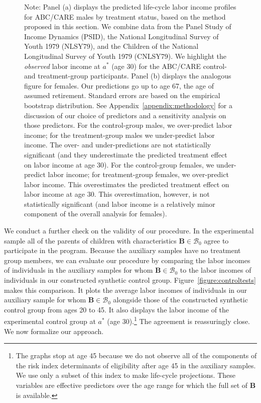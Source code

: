 \begin{figure}
\begin{subfigure}[h]{0.5\textwidth}
\end{subfigure}
\footnotesize \justify
Note: Panel (a) displays the predicted life-cycle labor income profiles for ABC/CARE males by treatment status, based on the method proposed in this section. We combine data from the Panel Study of Income Dynamics (PSID), the National Longitudinal Survey of Youth 1979 (NLSY79), and the Children of the National Longitudinal Survey of Youth 1979 (CNLSY79). We highlight the \textit{observed} labor income at $a^*$ (age 30) for the ABC/CARE control- and treatment-group participants. Panel (b) displays the analogous figure for females. Our predictions go up to age 67, the age of assumed retirement. Standard errors are based on the empirical bootstrap distribution. See  Appendix~\ref{appendix:methodology} for a discussion of our choice of predictors and a sensitivity analysis on those predictors. For the control-group males, we over-predict labor income; for the treatment-group males we under-predict labor income. The over- and under-predictions are not statistically significant (and they underestimate the predicted treatment effect on labor income at age 30). For the control-group females, we under-predict labor income; for treatment-group females, we over-predict labor income. This overestimates the predicted treatment effect on labor income at age 30. This overestimation, however, is not statistically significant (and labor income is a relatively minor component of the overall analysis for females).
\end{figure}

We conduct a further check on the validity of our procedure. In the experimental sample all of the parents of children with characteristics $\bm{B} \in \mathcal{B}_0$ agree to participate in the program.  Because the auxiliary samples have no treatment group members, we can evaluate our procedure by comparing the labor incomes of individuals in the auxiliary samples for whom $\bm{B} \in \mathcal{B}_0$ to the labor incomes of individuals in our constructed synthetic control group. Figure~\ref{figure:controltests} makes this comparison. It plots the average labor incomes of individuals in our auxiliary sample for whom $\bm{B} \in \mathcal{B}_0$ alongside those of the constructed synthetic control group from ages 20 to 45. It also displays the labor income of the experimental control group at $a^*$ (age 30).\footnote{The graphs stop at age 45 because we do not observe all of the components of the risk index determinants of eligibility after age 45 in the auxiliary samples. We use only a subset of this index to make life-cycle projections. These variables are effective predictors over the age range for which the full set of $\bm{B}$ is available.} The agreement is reassuringly close. We now formalize our approach.

